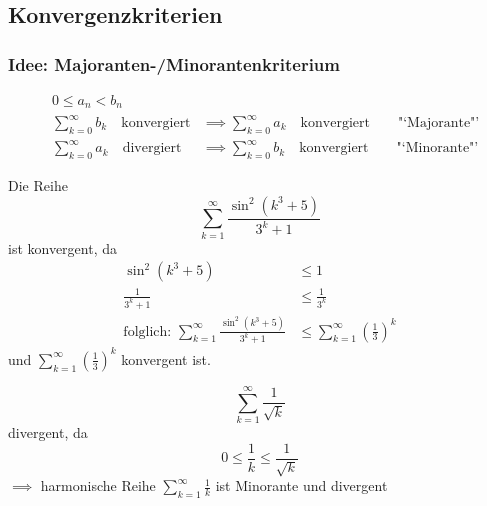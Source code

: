 

\subsection{Konvergenzkriterien}
\subsubsection*{Idee: Majoranten-/Minorantenkriterium}
	
\begin{align*}
	& 0 \leq a_n < b_n & \\
	& \sum_{k=0}^{\infty}b_k \quad\text{konvergiert} &\implies \sum_{k=0}^{\infty} a_k \quad\text{konvergiert} \qquad \text{"`Majorante"'} \\
	& \sum_{k=0}^{\infty}a_k \quad\text{divergiert} &\implies \sum_{k=0}^{\infty} b_k \quad\text{konvergiert} \qquad \text{"`Minorante"'}
\end{align*}

\begin{example}[Konvergenz]
    Die Reihe \[ \sum_{k=1}^{\infty} \frac{\sin^2 \left( k^3 + 5 \right) }{3^k + 1} \] ist konvergent, da
    \begin{align*}
        \sin^2 \left(k^3 + 5 \right) &\leq 1 \\
        \frac{1}{3^k+1} &\leq \frac{1}{3^k} \\
        \text{folglich: } \sum_{k=1}^{\infty} \frac{\sin^2 \left( k^3 + 5 \right) }{3^k + 1} &\leq \sum_{k=1}^{\infty} \left( \frac{1}{3} \right)^k
    \end{align*}
    und $\sum_{k=1}^{\infty} \left( \frac{1}{3} \right)^k$ konvergent ist.
\end{example}

\begin{example}[Divergenz]
    \begin{equation*}
      \sum_{k=1}^{\infty} \frac{1}{\sqrt{k}}
    \end{equation*}
    divergent, da
    \begin{equation*}
      0 \leq \frac{1}{k} \leq \frac{1}{\sqrt{k}}
    \end{equation*}
    $\implies$ harmonische Reihe $\sum_{k=1}^{\infty} \frac{1}{k}$ ist Minorante und divergent
\end{example}

